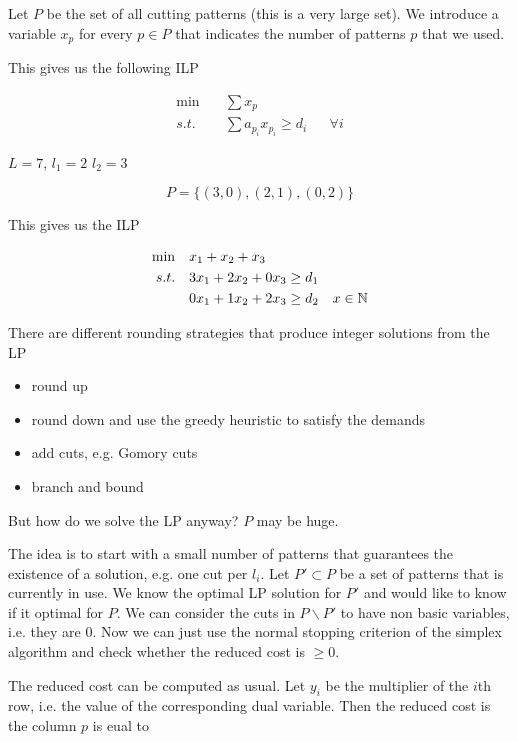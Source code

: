 Let $P$ be the set of all cutting patterns (this is a very large set). We introduce a variable $x_p$ for every $p\in P$ that indicates the number of patterns $p$ that we used.

This gives us the following ILP

\begin{align*}
\min \quad & \sum x_p\\
s.t. \quad & \sum a_{p_i}x_{p_i} \geq d_i && \forall i
\end{align*}

\begin{Ex} $L=7$, $l_1=2$ $l_2=3$

\[P=\{(3,0),(2,1),(0,2)\}\]

This gives us the ILP

\begin{align*}
\min \quad & x_1+x_2+x_3\\
s.t.\quad & 3x_1+2x_2+0x_3 \geq d_1\\
	&0x_1 + 1x_2+ 2x_3 \geq d_2
	&x\in \mathbb{N}
\end{align*}
\end{Ex}

There are different rounding strategies that produce integer solutions from the LP

\begin{itemize}
\item round up
\item round down and use the greedy heuristic to satisfy the demands
\item add cuts, e.g. Gomory cuts
\item branch and bound
\end{itemize}

But how do we solve the LP anyway? $P$ may be huge.

The idea is to start with a small number of patterns that guarantees the existence of a solution, e.g. one cut per $l_i$. Let $P'\subset P$ be a set of patterns that is currently in use. We know the optimal LP solution for $P'$ and would like to know if it optimal for $P$. We can consider the cuts in $P\backslash P'$ to have non basic variables, i.e. they are 0. Now we can just use the normal stopping criterion of the simplex algorithm and check whether the reduced cost is $\geq 0$.

The reduced cost can be computed as usual. Let $y_i$ be the multiplier of the $i$th row, i.e. the value of the corresponding dual variable. Then the reduced cost is the column $p$ is eual to

